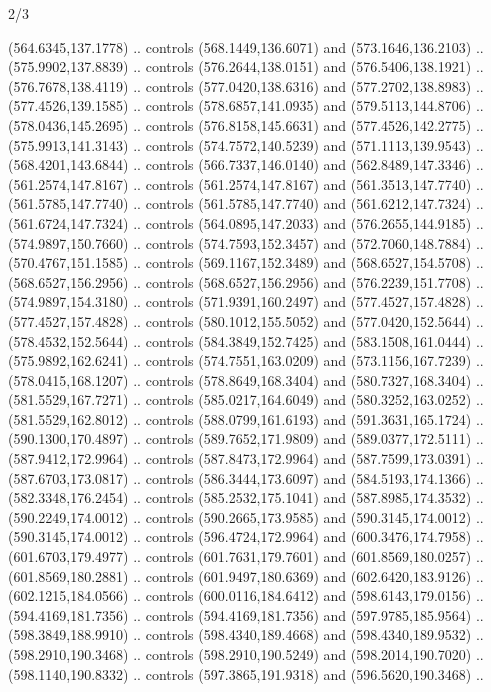 \begin{flagdescription}{2/3}
\begin{scope}[xshift=0.5\flaglength,yshift=0.5\flagwidth,scale=\flagwidth/525.28]
\begin{scope}[y=0.1mm, x=0.1mm, yscale=-1,shift={(-381.5,-404)}]
  (564.6345,137.1778) .. controls (568.1449,136.6071) and (573.1646,136.2103) ..
  (575.9902,137.8839) .. controls (576.2644,138.0151) and (576.5406,138.1921) ..
  (576.7678,138.4119) .. controls (577.0420,138.6316) and (577.2702,138.8983) ..
  (577.4526,139.1585) .. controls (578.6857,141.0935) and (579.5113,144.8706) ..
  (578.0436,145.2695) .. controls (576.8158,145.6631) and (577.4526,142.2775) ..
  (575.9913,141.3143) .. controls (574.7572,140.5239) and (571.1113,139.9543) ..
  (568.4201,143.6844) .. controls (566.7337,146.0140) and (562.8489,147.3346) ..
  (561.2574,147.8167) .. controls (561.2574,147.8167) and (561.3513,147.7740) ..
  (561.5785,147.7740) .. controls (561.5785,147.7740) and (561.6212,147.7324) ..
  (561.6724,147.7324) .. controls (564.0895,147.2033) and (576.2655,144.9185) ..
  (574.9897,150.7660) .. controls (574.7593,152.3457) and (572.7060,148.7884) ..
  (570.4767,151.1585) .. controls (569.1167,152.3489) and (568.6527,154.5708) ..
  (568.6527,156.2956) .. controls (568.6527,156.2956) and (576.2239,151.7708) ..
  (574.9897,154.3180) .. controls (571.9391,160.2497) and (577.4527,157.4828) ..
  (577.4527,157.4828) .. controls (580.1012,155.5052) and (577.0420,152.5644) ..
  (578.4532,152.5644) .. controls (584.3849,152.7425) and (583.1508,161.0444) ..
  (575.9892,162.6241) .. controls (574.7551,163.0209) and (573.1156,167.7239) ..
  (578.0415,168.1207) .. controls (578.8649,168.3404) and (580.7327,168.3404) ..
  (581.5529,167.7271) .. controls (585.0217,164.6049) and (580.3252,163.0252) ..
  (581.5529,162.8012) .. controls (588.0799,161.6193) and (591.3631,165.1724) ..
  (590.1300,170.4897) .. controls (589.7652,171.9809) and (589.0377,172.5111) ..
  (587.9412,172.9964) .. controls (587.8473,172.9964) and (587.7599,173.0391) ..
  (587.6703,173.0817) .. controls (586.3444,173.6097) and (584.5193,174.1366) ..
  (582.3348,176.2454) .. controls (585.2532,175.1041) and (587.8985,174.3532) ..
  (590.2249,174.0012) .. controls (590.2665,173.9585) and (590.3145,174.0012) ..
  (590.3145,174.0012) .. controls (596.4724,172.9964) and (600.3476,174.7958) ..
  (601.6703,179.4977) .. controls (601.7631,179.7601) and (601.8569,180.0257) ..
  (601.8569,180.2881) .. controls (601.9497,180.6369) and (602.6420,183.9126) ..
  (602.1215,184.0566) .. controls (600.0116,184.6412) and (598.6143,179.0156) ..
  (594.4169,181.7356) .. controls (594.4169,181.7356) and (597.9785,185.9564) ..
  (598.3849,188.9910) .. controls (598.4340,189.4668) and (598.4340,189.9532) ..
  (598.2910,190.3468) .. controls (598.2910,190.5249) and (598.2014,190.7020) ..
  (598.1140,190.8332) .. controls (597.3865,191.9318) and (596.5620,190.3468) ..

\end{scope}
\end{scope}
\end{flagdescription}
